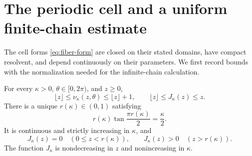 \section{The periodic cell and a uniform finite-chain estimate}
\label{sec:periodic}

The cell forms \eqref{eq:fiber-form} are closed on their stated
domains, have compact resolvent, and depend continuously on their
parameters. We first record bounds with the normalization needed
for the infinite-chain calculation.

\begin{lemma}
\label{lem:cell-bounds}
For every $\kappa>0$, $\theta\in[0,2\pi)$, and $z\ge0$,
\begin{equation}
 \lfloor z\rfloor\le\nu_\kappa(z,\theta)
                         \le\lfloor z\rfloor+1,
 \qquad
 \lfloor z\rfloor\le J_\kappa(z)\le z.
 \label{eq:cell-bounds}
\end{equation}
There is a unique $r(\kappa)\in(0,1)$ satisfying
\begin{equation}
 r(\kappa)\tan\frac{\pi r(\kappa)}2=\frac\kappa2.
 \label{eq:band-bottom}
\end{equation}
It is continuous and strictly increasing in $\kappa$, and
\begin{equation}
 J_\kappa(z)=0\quad(0\le z<r(\kappa)),
 \qquad J_\kappa(z)>0\quad(z>r(\kappa)).
 \label{eq:ids-gap}
\end{equation}
The function $J_\kappa$ is nondecreasing in $z$ and nonincreasing
in $\kappa$.
\end{lemma}

